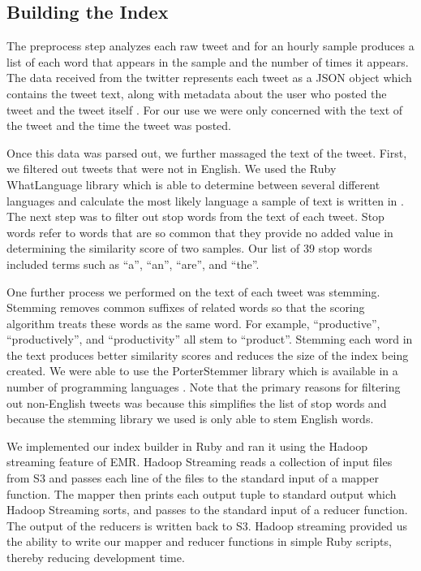 \documentclass[twocolumn]{article}
\begin{document}
\subsection{Building the Index}
The preprocess step analyzes each raw tweet and for an hourly sample produces a list of each word that appears in the sample and the number of times it appears. The data received from the twitter represents each tweet as a JSON object which contains the tweet text, along with metadata about the user who posted the tweet and the tweet itself \cite{twitterget}. For our use we were only concerned with the text of the tweet and the time the tweet was posted. 

Once this data was parsed out, we further massaged the text of the tweet. First, we filtered out tweets that were not in English. We used the Ruby WhatLanguage library which is able to determine between several different languages and calculate the most likely language a sample of text is written in \cite{whatlanguage}. The next step was to filter out stop words from the text of each tweet. Stop words refer to words that are so common that they provide no added value in determining the similarity score of two samples. Our list of 39 stop words included terms such as “a”, “an”, “are”, and “the”. 

One further process we performed on the text of each tweet was stemming. Stemming removes common suffixes of related words so that the scoring algorithm treats these words as the same word. For example, “productive”, “productively”, and “productivity” all stem to “product”. Stemming each word in the text produces better similarity scores and reduces the size of the index being created. We were able to use the PorterStemmer library which is available in a number of programming languages \cite{porterstem}. Note that the primary reasons for filtering out non-English tweets was because this simplifies the list of stop words and because the stemming library we used is only able to stem English words.

We implemented our index builder in Ruby and ran it using the Hadoop streaming feature of EMR. Hadoop Streaming reads a collection of input files from S3 and passes each line of the files to the standard input of a mapper function. The mapper then prints each output tuple to standard output which Hadoop Streaming sorts, and passes to the standard input of a reducer function. The output of the reducers is written back to S3. Hadoop streaming provided us the ability to write our mapper and reducer functions in simple Ruby scripts, thereby reducing development time.
\end{document}
